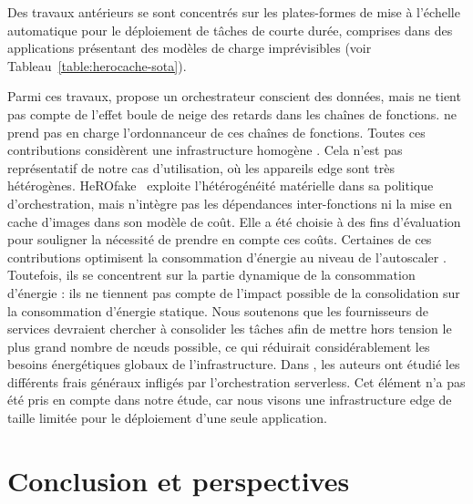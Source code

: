 Des travaux antérieurs se sont concentrés sur les plates-formes de mise à l'échelle automatique pour le déploiement de tâches de courte durée, comprises dans des applications présentant des modèles de charge imprévisibles (voir Tableau~\ref{table:herocache-sota}).

Parmi ces travaux, \cite{smithFaDOFaaSFunctions2022} propose un orchestrateur conscient des données, mais ne tient pas compte de l'effet boule de neige des retards dans les chaînes de fonctions. \cite{zhangFIRSTExploitingMultiDimensional2023} ne prend pas en charge l'ordonnanceur de ces chaînes de fonctions.
Toutes ces contributions considèrent une infrastructure homogène \cite{bhasiCypressInputSizesensitive2022, zijunFassflowEfficient2022, smithFaDOFaaSFunctions2022, zhangFIRSTExploitingMultiDimensional2023, abdiPaletteLoadBalancing2023}. Cela n'est pas représentatif de notre cas d'utilisation, où les appareils edge sont très hétérogènes. HeROfake~\cite{herofake} exploite l'hétérogénéité matérielle dans sa politique d'orchestration, mais n'intègre pas les dépendances inter-fonctions ni la mise en cache d'images dans son modèle de coût. Elle a été choisie à des fins d'évaluation pour souligner la nécessité de prendre en compte ces coûts.
Certaines de ces contributions optimisent la consommation d'énergie au niveau de l'autoscaler \cite{bhasiCypressInputSizesensitive2022, zhangFIRSTExploitingMultiDimensional2023}. Toutefois, ils se concentrent sur la partie dynamique de la consommation d'énergie : ils ne tiennent pas compte de l'impact possible de la consolidation sur la consommation d'énergie statique. Nous soutenons que les fournisseurs de services devraient chercher à consolider les tâches afin de mettre hors tension le plus grand nombre de nœuds possible, ce qui réduirait considérablement les besoins énergétiques globaux de l'infrastructure.
Dans \cite{fuerstIluvatarFastControl2023}, les auteurs ont étudié les différents frais généraux infligés par l'orchestration serverless. Cet élément n'a pas été pris en compte dans notre étude, car nous visons une infrastructure edge de taille limitée pour le déploiement d'une seule application.

\section{Conclusion et perspectives}
\label{section:herocache-conclusion}

